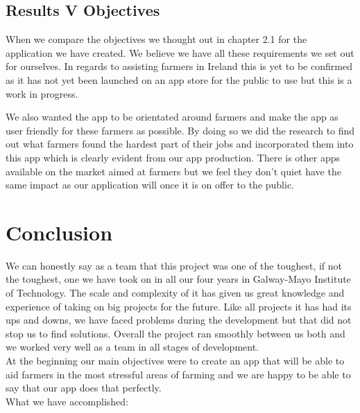 \documentclass[12pt,a4paper,oneside,openany]{book}
\begin{document}
\section{Results V Objectives}
When we compare the objectives we thought out in chapter 2.1 for the application we have created. We believe we have all these requirements we set out for ourselves. In regards to assisting farmers in Ireland this is yet to be confirmed as it has not yet been launched on an app store for the public to use but this is a work in progress.

We also wanted the app to be orientated around farmers and make the app as user friendly for these farmers as possible. By doing so we did the research to find out what farmers found the hardest part of their jobs and incorporated them into this app which is clearly evident from our app production. There is other apps available on the market aimed at farmers but we feel they don't quiet have the same impact as our application will once it is on offer to the public.

\chapter{Conclusion}
We can honestly say as a team that this project was one of the toughest, if not the toughest, one we have took on in all our four years in Galway-Mayo Institute of Technology. The scale and complexity of it has given us great knowledge and experience of taking on big projects for the future. Like all projects it has had its ups and downs, we have faced problems during the development but that did not stop us to find solutions. Overall the project ran smoothly between us both and we worked very well as a team in all stages of development.\\

\noindent At the beginning our main objectives were to create an app that will be able to aid farmers in the most stressful areas of farming and we are happy to be able to say that our app does that perfectly.\\

\noindent What we have accomplished:
\end{document}
